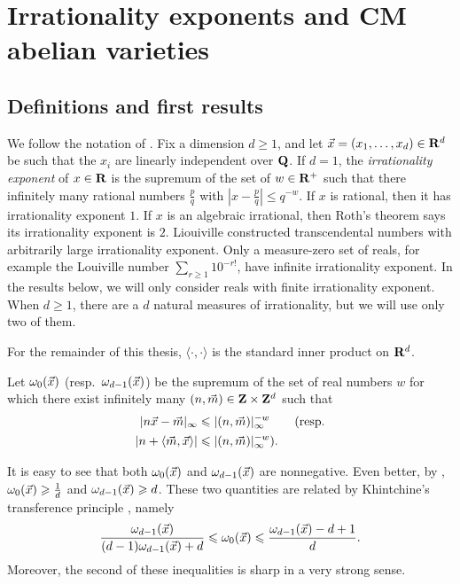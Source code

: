 
\chapter{Irrationality exponents and CM abelian varieties}\label{chapter:irrationality-exponent}





\section{Definitions and first results}

We follow the notation of \cite{laurent-2009}. Fix a dimension 
$d\geqslant 1$, and let $\vec{x}=(x_1,\dots,x_d)\in \mathbf{R}^d$ be such that the $x_i$ 
are linearly independent over $\mathbf{Q}$. If $d = 1$, the \emph{irrationality 
exponent} of $x\in \mathbf{R}$ is the supremum of the set of $w\in \mathbf{R}^+$ such that 
there infinitely many rational numbers $\frac p q$ with 
$\left| x - \frac p q\right| \leqslant q^{-w}$. If $x$ is rational, then it has 
irrationality exponent $1$. If $x$ is an algebraic irrational, then Roth's 
theorem says its irrationality exponent is $2$. Liouiville constructed 
transcendental numbers with arbitrarily large irrationality exponent. Only 
a measure-zero set of reals, for example the Louiville number 
$\sum_{r\geqslant 1} 10^{-r!}$, have infinite irrationality exponent. In the 
results below, we will only consider reals with finite irrationality exponent. 
When $d\geqslant 1$, there are a $d$ natural measures of irrationality, but we 
will use only two of them. 

For the remainder of this thesis, $\langle \cdot,\cdot\rangle$ is the standard 
inner product on $\mathbf{R}^d$. 

\begin{definition}\label{def:approx-exp}
Let $\omega_0(\vec{x})$ (resp.~$\omega_{d-1}(\vec{x})$) be the supremum of the set of 
real numbers $w$ for which there exist infinitely many 
$(n,\vec{m})\in \mathbf{Z}\times\mathbf{Z}^d$ such that 
\begin{align*}
	|n \vec{x} - \vec{m}|_\infty 
		&\leqslant |(n,\vec{m})|_\infty^{-w}  \qquad\text{(resp.} \\
	|n +\langle \vec{m},\vec{x}\rangle| 
		&\leqslant |(n,\vec{m})|_\infty^{-w} \text{).}
\end{align*}
\end{definition}

It is easy to see that both $\omega_0(\vec{x})$ and $\omega_{d-1}(\vec{x})$ are 
nonnegative. Even better, by \cite[Th.~2 Cor]{laurent-2009}, 
$\omega_0(\vec{x}) \geqslant \frac 1 d$ and $\omega_{d-1}(\vec{x}) \geqslant d$. 
These two quantities are related by Khintchine's transference 
principle \cite[Th.~2]{laurent-2009}, namely 
\[
	\frac{\omega_{d-1}(\vec{x})}{(d-1) \omega_{d-1}(\vec{x})+d} \leqslant \omega_0(\vec{x}) \leqslant \frac{\omega_{d-1}(\vec{x})-d+1}{d} .
\]
Moreover, the second of these inequalities is sharp in a very strong sense. 

